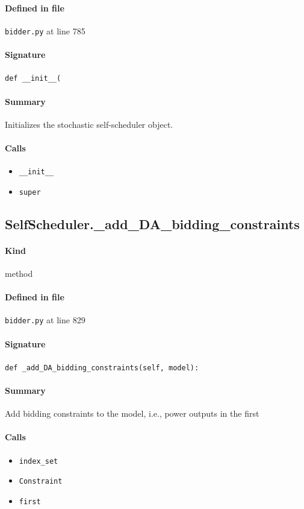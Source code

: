 \documentclass[11pt]{report}
\begin{document}
\paragraph{Defined in file} \texttt{bidder.py} at line 785
\paragraph{Signature} \texttt{def \_\_init\_\_(}
\paragraph{Summary} Initializes the stochastic self-scheduler object.
\paragraph{Calls}
\begin{itemize}[leftmargin=*]
  \item \texttt{\_\_init\_\_}
  \item \texttt{super}
\end{itemize}
\subsection{SelfScheduler.\_add\_DA\_bidding\_constraints}
\label{def:bidder.py:SelfScheduler._add_DA_bidding_constraints:L829}
\paragraph{Kind} method
\paragraph{Defined in file} \texttt{bidder.py} at line 829
\paragraph{Signature} \texttt{def \_add\_DA\_bidding\_constraints(self, model):}
\paragraph{Summary} Add bidding constraints to the model, i.e., power outputs in the first
\paragraph{Calls}
\begin{itemize}[leftmargin=*]
  \item \texttt{index\_set}
  \item \texttt{Constraint}
  \item \texttt{first}
\end{itemize}
\end{document}
